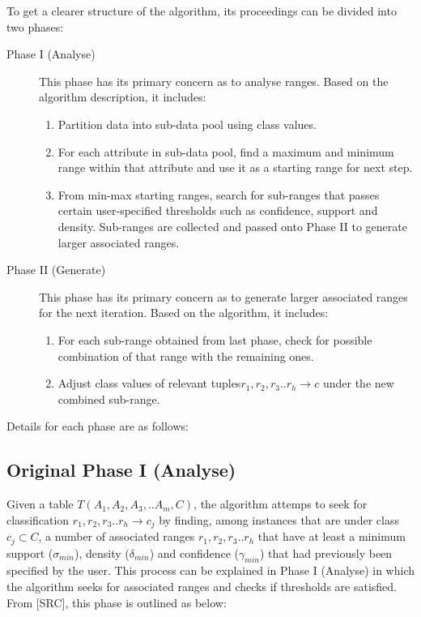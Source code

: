 To get a clearer structure of the algorithm, its proceedings can be divided into two phases:  \\

\begin{description}
\item[Phase I (Analyse)] 
This phase has its primary concern as to analyse ranges. Based on the algorithm description, it includes:
	\begin{enumerate}
	\item Partition data into sub-data pool using class values.
	\item For each attribute in sub-data pool, find a maximum and minimum range within that attribute and use it as a starting range for next step.
	\item From min-max starting ranges, search for sub-ranges that passes certain user-specified thresholds such as confidence, support and density. Sub-ranges are collected and passed onto Phase II to generate larger associated ranges. \\
	\end{enumerate}

\item[Phase II (Generate)] 
This phase has its primary concern as to generate larger associated ranges for the next iteration. Based on the algorithm, it includes:
	\begin{enumerate}
	\item For each sub-range obtained from last phase, check for possible combination of that range with the remaining ones.
	\item Adjust class values of relevant tuples$r_1, r_2, r_3..r_h \rightarrow c$ under the new combined sub-range.
	\end{enumerate}
\end{description}

Details for each phase are as follows:

\subsection{Original Phase I (Analyse)}

Given a table $T(A_1, A_2, A_3,..A_m, C)$, the algorithm attemps to seek for classification $r_1, r_2, r_3..r_h \rightarrow c_j$ by finding, among instances that are under class $c_j \subset C$, a number of associated ranges $r_1, r_2, r_3..r_h$ that have at least a minimum support ($\sigma_{min}$), density ($\delta_{min}$) and confidence ($\gamma_{min}$) that had previously been specified by the user. This process can be explained in Phase I (Analyse) in which the algorithm seeks for associated ranges and checks if thresholds are satisfied. From [SRC], this phase is outlined as below:

